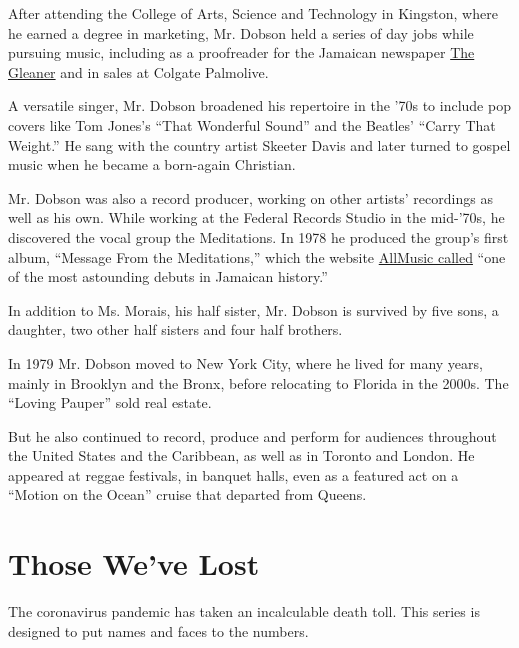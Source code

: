 After attending the College of Arts, Science and Technology in Kingston,
where he earned a degree in marketing, Mr. Dobson held a series of day
jobs while pursuing music, including as a proofreader for the Jamaican
newspaper \href{http://jamaica-gleaner.com/}{The Gleaner} and in sales
at Colgate Palmolive.

A versatile singer, Mr. Dobson broadened his repertoire in the '70s to
include pop covers like Tom Jones's ``That Wonderful Sound'' and the
Beatles' ``Carry That Weight.'' He sang with the country artist Skeeter
Davis and later turned to gospel music when he became a born-again
Christian.

Mr. Dobson was also a record producer, working on other artists'
recordings as well as his own. While working at the Federal Records
Studio in the mid-'70s, he discovered the vocal group the Meditations.
In 1978 he produced the group's first album, ``Message From the
Meditations,'' which the website
\href{https://www.allmusic.com/album/message-from-the-meditations-mw0000925754}{AllMusic
called} ``one of the most astounding debuts in Jamaican history.''

In addition to Ms. Morais, his half sister, Mr. Dobson is survived by
five sons, a daughter, two other half sisters and four half brothers.

In 1979 Mr. Dobson moved to New York City, where he lived for many
years, mainly in Brooklyn and the Bronx, before relocating to Florida in
the 2000s. The ``Loving Pauper'' sold real estate.

But he also continued to record, produce and perform for audiences
throughout the United States and the Caribbean, as well as in Toronto
and London. He appeared at reggae festivals, in banquet halls, even as a
featured act on a ``Motion on the Ocean'' cruise that departed from
Queens.

\href{https://www.nytimes3xbfgragh.onion/interactive/2020/obituaries/people-died-coronavirus-obituaries.html?action=click\&pgtype=Article\&state=default\&region=BELOW_MAIN_CONTENT\&context=covid_obits_promo}{}

\hypertarget{those-weve-lost}{%
\section{Those We've Lost}\label{those-weve-lost}}

The coronavirus pandemic has taken an incalculable death toll. This
series is designed to put names and faces to the numbers.

